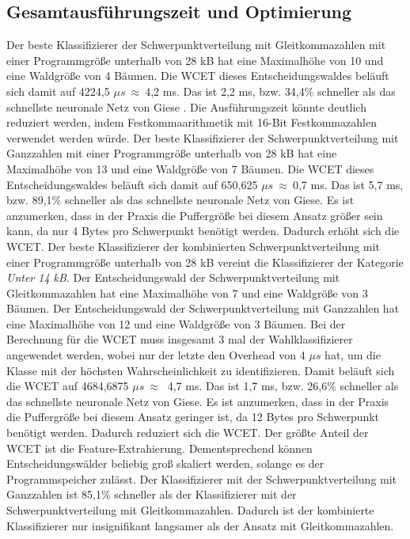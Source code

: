 \subsection{Gesamtausführungszeit und Optimierung}
Der beste Klassifizierer der Schwerpunktverteilung mit Gleitkommazahlen mit einer Programmgröße unterhalb von 28 kB hat eine Maximalhöhe von 10 und eine Waldgröße von 4 Bäumen. Die WCET dieses Entscheidungswaldes
beläuft sich damit auf 4224,5 $\mu s\ \approx\ $4,2 ms. Das ist 2,2 ms, bzw. 34,4\% schneller als das schnellste neuronale Netz von Giese \cite{gieseThesis}. Die Ausführungszeit könnte deutlich reduziert werden, indem
Festkommaarithmetik mit 16-Bit Festkommazahlen verwendet werden würde.
\newline
\newline
Der beste Klassifizierer der Schwerpunktverteilung mit Ganzzahlen mit einer Programmgröße unterhalb von 28 kB hat eine Maximalhöhe von 13 und eine Waldgröße von 7 Bäumen. Die WCET dieses Entscheidungswaldes
beläuft sich damit auf 650,625 $\mu s\ \approx\ $0,7 ms. Das ist 5,7 ms, bzw. 89,1\% schneller als das schnellste neuronale Netz von Giese. Es ist anzumerken, dass in der Praxis die Puffergröße
bei diesem Ansatz größer sein kann, da nur 4 Bytes pro Schwerpunkt benötigt werden. Dadurch erhöht sich die WCET.
\newline
\newline
Der beste Klassifizierer der kombinierten Schwerpunktverteilung mit einer Programmgröße unterhalb von 28 kB vereint die Klassifizierer der Kategorie \textit{Unter 14 kB}. Der Entscheidungswald der Schwerpunktverteilung
mit Gleitkommazahlen hat eine Maximalhöhe von 7 und eine Waldgröße von 3 Bäumen. Der Entscheidungswald der Schwerpunktverteilung mit Ganzzahlen hat eine Maximalhöhe von 12 und eine Waldgröße von 3 Bäumen. Bei der
Berechnung für die WCET muss insgesamt 3 mal der Wahlklassifizierer angewendet werden, wobei nur der letzte den Overhead von 4 $\mu s$ hat, um die Klasse mit der höchsten Wahrscheinlichkeit zu identifizieren. Damit
beläuft sich die WCET auf 4684,6875 $\mu s\ \approx\ $ 4,7 ms. Das ist 1,7 ms, bzw. 26,6\% schneller als das schnellste neuronale Netz von Giese. Es ist anzumerken, dass in der Praxis die Puffergröße
bei diesem Ansatz geringer ist, da 12 Bytes pro Schwerpunkt benötigt werden. Dadurch reduziert sich die WCET.
\newline
\newline
Der größte Anteil der WCET ist die Feature-Extrahierung. Dementsprechend können Entscheidungswälder beliebig groß skaliert werden, solange es der Programmspeicher zulässt. Der Klassifizierer mit der Schwerpunktverteilung
mit Ganzzahlen ist 85,1\% schneller als der Klassifizierer mit der Schwerpunktverteilung mit Gleitkommazahlen. Dadurch ist der kombinierte Klassifizierer nur insignifikant langsamer als der Ansatz mit Gleitkommazahlen.